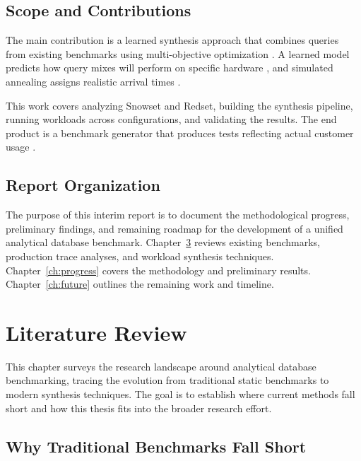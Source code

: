 \documentclass[12pt]{report}
\begin{document}
\section{Scope and Contributions}
\label{sec:scope}

The main contribution is a learned synthesis approach that combines queries from existing benchmarks using multi-objective optimization \cite{pbench}. A learned model predicts how query mixes will perform on specific hardware \cite{stitcher}, and simulated annealing assigns realistic arrival times \cite{pbench}.

This work covers analyzing Snowset and Redset, building the synthesis pipeline, running workloads across configurations, and validating the results. The end product is a benchmark generator that produces tests reflecting actual customer usage \cite{redset}.

\section{Report Organization}
\label{sec:organization}

The purpose of this interim report is to document the methodological progress, preliminary findings, and remaining roadmap for the development of a unified analytical database benchmark. Chapter~\ref{ch:literature} reviews existing benchmarks, production trace analyses, and workload synthesis techniques. Chapter~\ref{ch:progress} covers the methodology and preliminary results. Chapter~\ref{ch:future} outlines the remaining work and timeline.

\chapter{Literature Review}
\label{ch:literature}

This chapter surveys the research landscape around analytical database benchmarking, tracing the evolution from traditional static benchmarks to modern synthesis techniques. The goal is to establish where current methods fall short and how this thesis fits into the broader research effort.

\section{Why Traditional Benchmarks Fall Short}
\label{sec:traditional-benchmarks}
\end{document}
